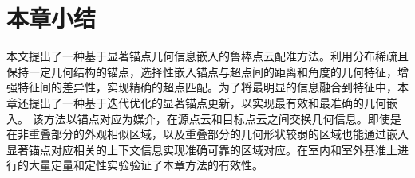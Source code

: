     \section{本章小结}
    本文提出了一种基于显著锚点几何信息嵌入的鲁棒点云配准方法。利用分布稀疏且保持一定几何结构的锚点，选择性嵌入锚点与超点间的距离和角度的几何特征，增强特征间的差异性，实现精确的超点匹配。为了将最明显的信息融合到特征中，本章还提出了一种基于迭代优化的显著锚点更新，以实现最有效和最准确的几何嵌入。
    该方法以锚点对应为媒介，在源点云和目标点云之间交换几何信息。即使是在非重叠部分的外观相似区域，以及重叠部分的几何形状较弱的区域也能通过嵌入显著锚点对应相关的上下文信息实现准确可靠的区域对应。在室内和室外基准上进行的大量定量和定性实验验证了本章方法的有效性。
